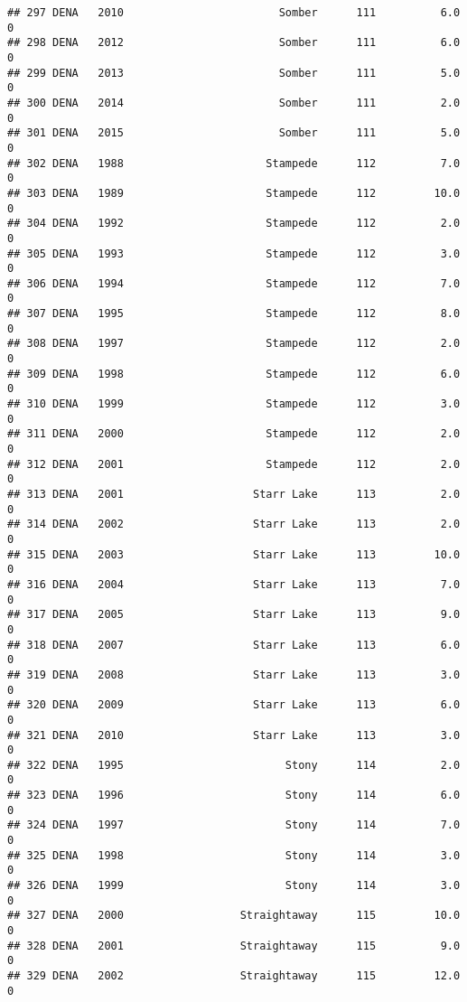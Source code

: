 \documentclass[
]{article}
\begin{document}
\begin{verbatim}
## 297 DENA   2010                        Somber      111          6.0       0
## 298 DENA   2012                        Somber      111          6.0       0
## 299 DENA   2013                        Somber      111          5.0       0
## 300 DENA   2014                        Somber      111          2.0       0
## 301 DENA   2015                        Somber      111          5.0       0
## 302 DENA   1988                      Stampede      112          7.0       0
## 303 DENA   1989                      Stampede      112         10.0       0
## 304 DENA   1992                      Stampede      112          2.0       0
## 305 DENA   1993                      Stampede      112          3.0       0
## 306 DENA   1994                      Stampede      112          7.0       0
## 307 DENA   1995                      Stampede      112          8.0       0
## 308 DENA   1997                      Stampede      112          2.0       0
## 309 DENA   1998                      Stampede      112          6.0       0
## 310 DENA   1999                      Stampede      112          3.0       0
## 311 DENA   2000                      Stampede      112          2.0       0
## 312 DENA   2001                      Stampede      112          2.0       0
## 313 DENA   2001                    Starr Lake      113          2.0       0
## 314 DENA   2002                    Starr Lake      113          2.0       0
## 315 DENA   2003                    Starr Lake      113         10.0       0
## 316 DENA   2004                    Starr Lake      113          7.0       0
## 317 DENA   2005                    Starr Lake      113          9.0       0
## 318 DENA   2007                    Starr Lake      113          6.0       0
## 319 DENA   2008                    Starr Lake      113          3.0       0
## 320 DENA   2009                    Starr Lake      113          6.0       0
## 321 DENA   2010                    Starr Lake      113          3.0       0
## 322 DENA   1995                         Stony      114          2.0       0
## 323 DENA   1996                         Stony      114          6.0       0
## 324 DENA   1997                         Stony      114          7.0       0
## 325 DENA   1998                         Stony      114          3.0       0
## 326 DENA   1999                         Stony      114          3.0       0
## 327 DENA   2000                  Straightaway      115         10.0       0
## 328 DENA   2001                  Straightaway      115          9.0       0
## 329 DENA   2002                  Straightaway      115         12.0       0

\end{verbatim}
\end{document}
